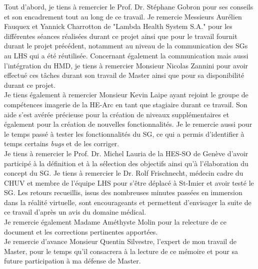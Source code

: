 Tout d'abord, je tiens à remercier le Prof. Dr. Stéphane Gobron pour ses conseils et son encadrement tout au long de ce travail.
Je remercie Messieurs Aurélien Fauquex et Yannick Charrotton de "Lambda Health System S.A." pour les différentes séances réalisées durant ce projet ainsi que pour le travail fournit durant le projet précédent, notamment au niveau de la communication des SGs au LHS qui a été réutilisée.
Concernant également la communication mais aussi l'intégration du HMD, je tiens à remercier Monsieur Nicolas Zannini pour avoir effectué ces tâches durant son travail de Master ainsi que pour sa disponibilité durant ce projet.
\\

Je tiens également à remercier Monsieur Kevin Laipe ayant rejoint le groupe de compétences imagerie de la HE-Arc en tant que stagiaire durant ce travail. Son aide s'est avérée précieuse pour la création de niveaux supplémentaires et également pour la création de nouvelles fonctionnalités. Je le remercie aussi pour le temps passé à tester les fonctionnalités du SG, ce qui a permis d'identifier à temps certains \textit{bugs} et de les corriger.
\\

Je tiens à remercier le Prof. Dr. Michel Lauria de la HES-SO de Genève d'avoir participé à la définition et à la sélection des objectifs ainsi qu'à l'élaboration du concept du SG.
Je tiens à remercier le Dr. Rolf Frischnecht, médecin cadre du CHUV et membre de l'équipe LHS pour s'être déplacé à St-Imier et avoir testé le SG. Les retours recueillis, issus des nombreuses minutes passées en immersion dans la réalité virtuelle, sont encourageants et permettent d'envisager la suite de ce travail d'après un avis du domaine médical.
\\

Je remercie également Madame Améthyste Molin pour la relecture de ce document et les corrections pertinentes apportées.
\\

Je remercie d’avance Monsieur Quentin Silvestre, l’expert de mon travail de Master, pour le temps qu’il consacrera à la lecture de ce mémoire et pour sa future participation à ma défense de Master.